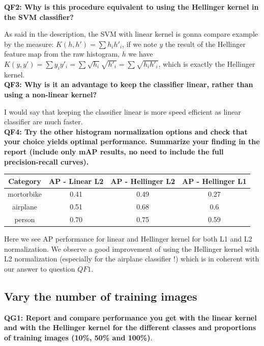 \documentclass[a4paper,11pt]{exam}
\begin{document}
\textbf{QF2: Why is this procedure equivalent to using the Hellinger kernel in the SVM classifier?\\}

As said in the description, the SVM with linear kernel is gonna compare example by the measure: $K(h,h') = \sum h_{i} h'_{i}$, if we note $y$ the result of the Hellinger feature map from the raw histogram, $h$ we have $K(y,y') = \sum y_{i} y'_{i} = \sum \sqrt{h_{i}}\sqrt{h'_{i}} =  \sum \sqrt{ h_{i} h'_{i}}$, which is exactly the Hellinger kernel.\\

\textbf{QF3: Why is it an advantage to keep the classifier linear, rather than using a non-linear kernel?\\}

I would say that keeping the classifier linear is more speed efficient as linear classifier are much faster.\\

\textbf{QF4: Try the other histogram normalization options and check that your choice yields optimal performance. Summarize your finding in the report (include only mAP results, no need to include the full precision-recall curves).\\}

\begin{center}
	\begin{tabular}{ c | c | c | c }
   		 \hline
		   Category & AP - Linear L2 &  AP - Hellinger L2 & AP - Hellinger L1 \\	
		   \hline
   		  mortorbike & 0.41 & 0.49 &  0.27 \\
  		  airplane & 0.51 & 0.68 & 0.6 \\
		  person & 0.70 & 0.75 &  0.59\\
		\hline
 	\end{tabular}
\end{center}

Here we see AP performance for linear and Hellinger kernel for both L1 and L2 normalization. We observe a good improvement of using the Hellinger kernel with L2 normalization (especially for the airplane classifier !) which is in coherent with our answer to question $QF1$.

\subsection{Vary the number of training images}

\textbf{QG1: Report and compare performance you get with the linear kernel  and with the Hellinger kernel for the different classes and proportions of training images (10\%, 50\% and 100\%)}.
\end{document}
